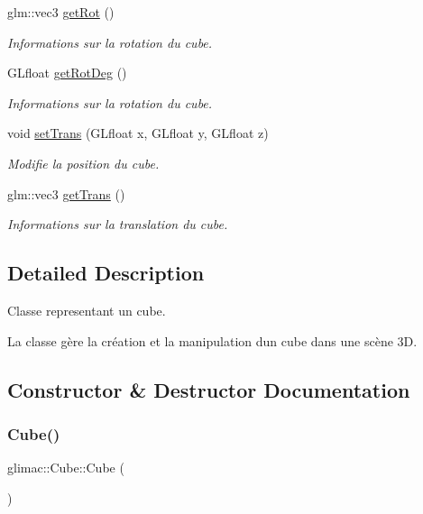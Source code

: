 \begin{DoxyCompactItemize}
glm\+::vec3 \hyperlink{classglimac_1_1Cube_a1f4f0a3b4e1b4b320c4f7f3476e42985}{get\+Rot} ()
\begin{DoxyCompactList}\small\item\em Informations sur la rotation du cube. \end{DoxyCompactList}\item 
G\+Lfloat \hyperlink{classglimac_1_1Cube_ad642ba1d2cd3727b861716275497c5f7}{get\+Rot\+Deg} ()
\begin{DoxyCompactList}\small\item\em Informations sur la rotation du cube. \end{DoxyCompactList}\item 
void \hyperlink{classglimac_1_1Cube_a98ab0f3b4ea21152fafe61b11dc09652}{set\+Trans} (G\+Lfloat x, G\+Lfloat y, G\+Lfloat z)
\begin{DoxyCompactList}\small\item\em Modifie la position du cube. \end{DoxyCompactList}\item 
glm\+::vec3 \hyperlink{classglimac_1_1Cube_a712b915cbe82f811229cedcb849e52fc}{get\+Trans} ()
\begin{DoxyCompactList}\small\item\em Informations sur la translation du cube. \end{DoxyCompactList}\end{DoxyCompactItemize}


\subsection{Detailed Description}
Classe representant un cube. 

La classe gère la création et la manipulation d\textquotesingle{}un cube dans une scène 3D. 

\subsection{Constructor \& Destructor Documentation}
\mbox{\label{classglimac_1_1Cube_a801f14f22e31defc97297ee0f3409856}} 
\subsubsection{\texorpdfstring{Cube()}{Cube()}}
{\footnotesize\ttfamily glimac\+::\+Cube\+::\+Cube (\begin{DoxyParamCaption}{ }\end{DoxyParamCaption})\hspace{0.3cm}{\ttfamily [inline]}}



